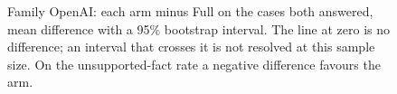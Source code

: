 \begin{figure}[!t]
\caption{Family OpenAI: each arm minus Full on the cases both answered, mean difference with a 95\% bootstrap interval. The line at zero is no difference; an interval that crosses it is not resolved at this sample size. On the unsupported-fact rate a negative difference favours the arm.}
\label{fig:forest_openai}
\end{figure}
